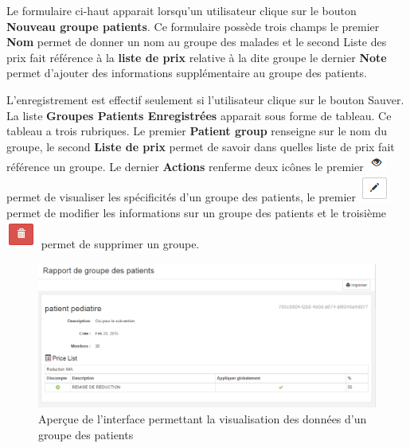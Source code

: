 \documentclass[12pt,a4paper]{report}
\begin{document}
Le formulaire ci-haut apparait lorsqu'un utilisateur clique sur le bouton \textbf{Nouveau groupe patients}. Ce formulaire possède trois champs le premier \textbf{Nom} permet de donner un nom au groupe des malades et le second Liste des prix fait référence à la \textbf{liste de prix} relative à la dite groupe le dernier \textbf{Note} permet d'ajouter des informations supplémentaire au groupe des patients.

L'enregistrement est effectif seulement si l'utilisateur clique sur le bouton Sauver. La liste \textbf{Groupes Patients Enregistrées} apparait sous forme de tableau. Ce tableau a trois rubriques. Le premier \textbf{Patient group} renseigne sur le nom du groupe, le second \textbf{Liste de prix} permet de savoir dans quelles liste de prix fait référence un groupe. Le dernier \textbf{Actions} renferme deux icônes le premier \includegraphics[scale=0.7]{pic/blackEyes.png}  permet de visualiser les spécificités d'un groupe des patients, le premier \includegraphics[scale=0.7]{pic/EditBlack.png}  permet de modifier les informations sur un groupe des patients et le troisième \includegraphics[scale=0.7]{pic/DeleteRed.png}  permet de supprimer un groupe.


\begin{figure}[h]
\begin{center}
\includegraphics[width=12cm]{pic/DetaiGrouPAtient.png}
\end{center}
\caption{Aperçue de l'interface permettant la visualisation des données d'un groupe des patients}
\label{Aperçue de l'interface permettant la visualisation des données d'un groupe des patients}
\end{figure}
\end{document}
